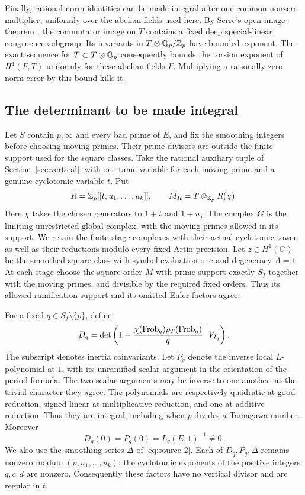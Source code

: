 Finally, rational norm identities can be made integral after one common
nonzero multiplier, uniformly over the abelian fields used here.
By Serre's open-image theorem \cite{Serre}, the commutator image on
\(T\) contains a fixed deep special-linear congruence subgroup.
Its invariants in \(T\otimes\mathbb Q_p/\mathbb Z_p\) have bounded exponent.
The exact sequence for \(T\subset T\otimes\mathbb Q_p\) consequently bounds
the torsion exponent of \(H^1(F,T)\) uniformly for these abelian fields
\(F\).  Multiplying a rationally zero norm error by this bound kills it.

\subsection{The determinant to be made integral}

Let \(S\) contain \(p,\infty\) and every bad prime of \(E\), and fix
the smoothing integers before choosing moving primes.  Their prime
divisors are outside the finite support used for the square classes.
Take the rational auxiliary tuple of Section~\ref{sec:vertical}, with
one tame variable for each moving prime and a genuine cyclotomic
variable \(t\).  Put
\[
 R=\mathbb Z_p[[t,u_1,\ldots,u_k]],\qquad M_R=T\otimes_{\mathbb Z_p}R(\chi).
\]
Here \(\chi\) takes the chosen generators to \(1+t\) and
\(1+u_j\).  The complex \(G\) is the limiting unrestricted global
complex, with the moving primes allowed in its support.  We retain
the finite-stage complexes with their actual cyclotomic tower, as
well as their reductions modulo every fixed Artin precision.  Let
\(z\in H^1(G)\) be the smoothed square class with symbol evaluation
one and degeneracy \(A=1\).  At each stage choose the square order
\(M\) with prime support exactly \(S_f\) together with the moving
primes, and divisible by the required fixed orders.  Thus its
allowed ramification support and its omitted Euler factors agree.

For a fixed \(q\in S_f\setminus\{p\}\), define
\[
 D_q=\det\left(1-\frac{\chi(\operatorname{Frob}_q)\rho_T(\operatorname{Frob}_q)}q
                         \,\middle|\,V_{I_q}\right).
\]
The subscript denotes inertia coinvariants.  Let \(P_q\) denote the
inverse local \(L\)-polynomial at \(1\), with its unramified scalar
argument in the orientation of the period formula.  The two scalar
arguments may be inverse to one another; at the trivial character
they agree.  The polynomials are respectively quadratic at good
reduction, signed linear at multiplicative reduction, and one at
additive reduction.  Thus they are integral, including when \(p\)
divides a Tamagawa number.  Moreover
\[
 D_q(0)=P_q(0)=L_q(E,1)^{-1}\ne0.
\]
We also use the smoothing series \(\Delta\) of
\eqref{eq:source-2}.  Each of \(D_q,P_q,\Delta\) remains nonzero
modulo \((p,u_1,\ldots,u_k)\): the cyclotomic exponents of the
positive integers \(q,c,d\) are nonzero.  Consequently these factors
have no vertical divisor and are regular in \(t\).

